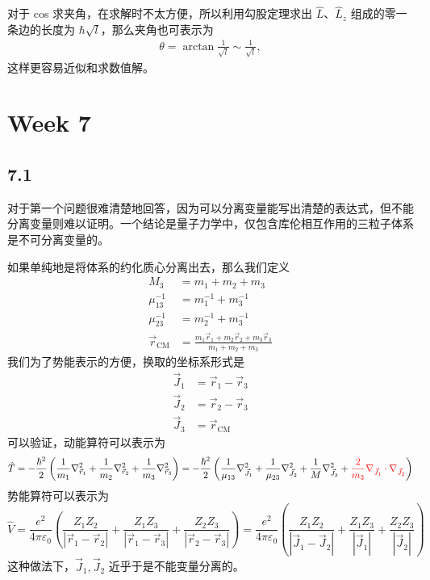 对于 cos 求夹角，在求解时不太方便，所以利用勾股定理求出 $\hat L$、$\hat L_z$ 组成的零一条边的长度为 $\hbar \sqrt{l}$，那么夹角也可表示为
\begin{align}
    \theta = \arctan \frac1{\sqrt{l}} \sim \frac1{\sqrt l}, 
\end{align}
这样更容易近似和求数值解。

\section{Week 7}
\subsection{7.1}
对于第一个问题很难清楚地回答，因为可以分离变量能写出清楚的表达式，但不能分离变量则难以证明。一个结论是量子力学中，仅包含\textsf{库伦相互作用}的三粒子体系是不可分离变量的。

如果单纯地是将体系的约化质心分离出去，那么我们定义
\begin{align*}
M_3 &= m_1 + m_2 + m_3 \\
\mu_{13}^{-1} &= m_1^{-1} + m_3^{-1} \\
\mu_{23}^{-1} &= m_2^{-1} + m_3^{-1} \\
\vec{r}_\mathrm{CM} &= \frac{m_1 \vec{r}_1 + m_2 \vec{r}_2 + m_3 \vec{r}_3}{m_1 + m_2 + m_3}
\end{align*}
我们为了势能表示的方便，换取的坐标系形式是
\begin{align*}
\vec{J}_1 &= \vec{r}_1 - \vec{r}_3 \\
\vec{J}_2 &= \vec{r}_2 - \vec{r}_3 \\
\vec{J}_3 &= \vec{r}_\mathrm{CM}
\end{align*}
可以验证，动能算符可以表示为
\begin{equation*}
\hat T
= - \frac{\hbar^2}{2} \left( \frac{1}{m_1} \nabla_{\vec{r}_1}^2 + \frac{1}{m_2} \nabla_{\vec{r}_2}^2 + \frac{1}{m_3} \nabla_{\vec{r}_3}^2 \right)
= - \frac{\hbar^2}{2} \left( \frac{1}{\mu_{13}} \nabla_{\vec{J}_1}^2 + \frac{1}{\mu_{23}} \nabla_{\vec{J}_2}^2 + \frac{1}{M} \nabla_{\vec{J}_3}^2 + {\color{red} \frac{2}{m_3} \nabla_{\vec{J}_1} \cdot \nabla_{\vec{J}_2}} \right)
\end{equation*}
势能算符可以表示为
\begin{equation*}
\hat V
= \frac{e^2}{4 \pi \varepsilon_0} \left( \frac{Z_1 Z_2}{|\vec{r}_1 - \vec{r}_2|} + \frac{Z_1 Z_3}{|\vec{r}_1 - \vec{r}_3|} + \frac{Z_2 Z_3}{|\vec{r}_2 - \vec{r}_3|} \right)
= \frac{e^2}{4 \pi \varepsilon_0} \left( \frac{Z_1 Z_2}{|\vec{J}_1 - \vec{J}_2|} + \frac{Z_1 Z_3}{|\vec{J}_1|} + \frac{Z_2 Z_3}{|\vec{J}_2|} \right)
\end{equation*}
这种做法下，$\vec{J}_1, \vec{J}_2$ 近乎于是不能变量分离的。

